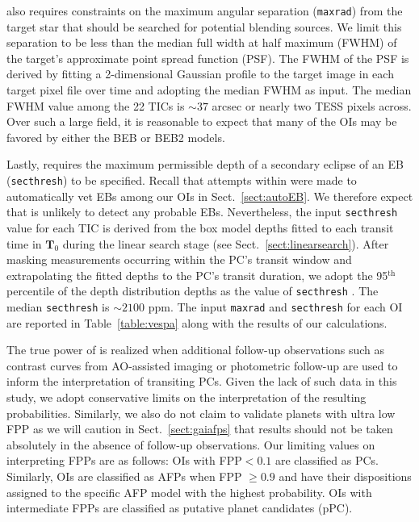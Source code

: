 \vespa{} also requires constraints on the maximum angular separation
(\texttt{maxrad}) from the target star that
should be searched for potential blending sources. We limit this separation to be less than the median
full width at half maximum (FWHM) of the target's approximate point spread function (PSF).
The FWHM of the PSF is derived by fitting a 2-dimensional Gaussian profile to the
target image in each target pixel file over time and adopting the median FWHM as \vespa{} input.
The median FWHM value among the 22 TICs is $\sim 37$ arcsec or nearly two TESS pixels across.
Over such a large field, it is reasonable to expect that many of the OIs may be favored by either the
BEB or BEB2 models.

Lastly, \vespa{} requires
the maximum permissible depth of a secondary eclipse of an EB (\texttt{secthresh}) to be specified.
Recall that attempts within \pipeline{} were made to automatically vet EBs among our OIs in
Sect.~\ref{sect:autoEB}.
We therefore expect that \vespa{} is unlikely to detect any probable EBs. Nevertheless, the input
\texttt{secthresh} value for each TIC is derived from
the box model depths fitted to each transit time in $\mathbf{T}_0$ during the linear search stage
(see Sect.~\ref{sect:linearsearch}). After masking measurements occurring within the PC's
transit window and extrapolating the fitted depths to the PC's transit duration,
we adopt the 95$^{\text{th}}$ percentile of the depth distribution depths as the value of \texttt{secthresh}
\citep{crossfield18}. The median \texttt{secthresh} is $\sim 2100$ ppm. The input \texttt{maxrad} and
\texttt{secthresh} for each OI are reported in Table~\ref{table:vespa} along with the results of
our \vespa{} calculations.

The true power of \vespa{} is realized when additional follow-up observations such as 
contrast curves from AO-assisted imaging or photometric follow-up
are used to inform the interpretation of transiting PCs.
Given the lack of such data in this study, we adopt conservative limits on the interpretation of the
resulting \vespa{} probabilities. Similarly, we also do not claim to validate planets with ultra low FPP
\citep[$<0.01$; e.g.][]{montet15,crossfield18,livingston18} as we will caution in Sect.~\ref{sect:gaiafps}
that \vespa{} results should not be taken absolutely in the absence of follow-up
observations. Our limiting values on interpreting FPPs are as follows: OIs with FPP$<0.1$
are classified as PCs. Similarly, OIs are classified as AFPs when
FPP $\geq 0.9$ and have their dispositions assigned to the specific AFP model with the highest
probability. OIs with intermediate FPPs are classified as putative planet candidates (pPC).

